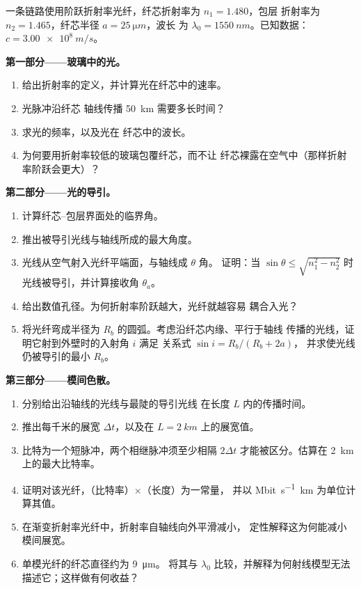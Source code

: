 \begin{problem}
\label{pb:b1:rays-reflection-refraction:1}
一条链路使用阶跃折射率光纤，纤芯折射率为 $n_1 = 1.480$，包层
折射率为 $n_2 = 1.465$，纤芯半径 $a = \qty{25}{\micro m}$，波长
为 $\lambda_0 = \qty{1550}{nm}$。已知数据：$c = \qty{3.00e8}{m/s}$。

\medskip
\noindent\textbf{第一部分——玻璃中的光。}
\begin{enumerate}
  \item 给出折射率的定义，并计算光在纤芯中的速率。
  \item 光脉冲沿纤芯
        轴线传播 \qty{50}{km} 需要多长时间？
  \item 求光的频率，以及光在
        纤芯中的波长。
  \item 为何要用折射率较低的玻璃包覆纤芯，而不让
        纤芯裸露在空气中（那样折射率阶跃会更大）？
\end{enumerate}

\medskip
\noindent\textbf{第二部分——光的导引。}
\begin{enumerate}[resume]
  \item 计算纤芯–包层界面处的临界角。
  \item 推出被导引光线与轴线所成的最大角度。
  \item 光线从空气射入光纤平端面，与轴线成 $\theta$ 角。
        证明：当 $\sin\theta \leq
        \sqrt{n_1^2 - n_2^2}$ 时光线被导引，并计算接收角
        $\theta_a$。
  \item 给出数值孔径。为何折射率阶跃越大，光纤就越容易
        耦合入光？
  \item 将光纤弯成半径为 $R_b$ 的圆弧。考虑沿纤芯内缘、平行于轴线
        传播的光线，证明它射到外壁时的入射角 $i$ 满足
        关系式
        $\sin i = R_b/(R_b + 2a)$，
        并求使光线仍被导引的最小 $R_b$。
\end{enumerate}

\medskip
\noindent\textbf{第三部分——模间色散。}
\begin{enumerate}[resume]
  \item 分别给出沿轴线的光线与最陡的导引光线
        在长度 $L$ 内的传播时间。
  \item 推出每千米的展宽 $\Delta t$，以及在
        $L = \qty{2}{km}$ 上的展宽值。
  \item 比特为一个短脉冲，两个相继脉冲须至少相隔
        $2\Delta t$ 才能被区分。估算在
        \qty{2}{km} 上的最大比特率。
  \item 证明对该光纤，（比特率）$\times$（长度）为一常量，
        并以 \unit{Mbit.s^{-1}.km} 为单位计算其值。
  \item 在渐变折射率光纤中，折射率自轴线向外平滑减小，
        定性解释这为何能减小
        模间展宽。
  \item 单模光纤的纤芯直径约为 \qty{9}{\micro m}。
        将其与 $\lambda_0$ 比较，并解释为何射线模型无法
        描述它；这样做有何收益？
\end{enumerate}


\end{problem}
